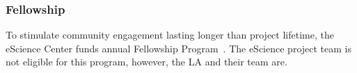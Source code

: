 \subsubsection{Fellowship}
\label{sec:opportunities:fellowship}
To stimulate community engagement lasting longer than project lifetime, the eScience Center funds annual Fellowship
Program~\cite{fellowship,fellowship-call}. The eScience project team is not eligible for this program, however, the LA and their team are.
